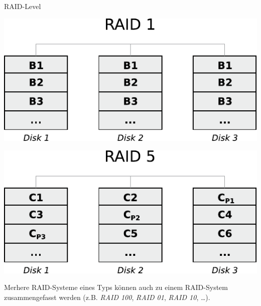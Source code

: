\begin{defi}{RAID-Level}
\begin{center}
        \includegraphics[]{images/raid1.pdf}

        \includegraphics[]{images/raid5.pdf}
    \end{center}

    Merhere RAID-Systeme eines Typs können auch zu einem RAID-System zusammengefasst werden (z.B. \emph{RAID 100}, \emph{RAID 01}, \emph{RAID 10}, \ldots).
\end{defi}

